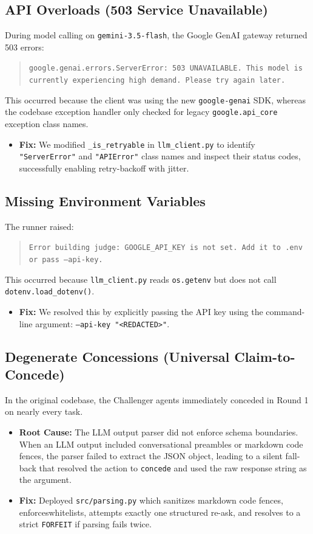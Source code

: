 \documentclass[11pt]{article}
\begin{document}
\subsection{API Overloads (503 Service Unavailable)}
During model calling on \texttt{gemini-3.5-flash}, the Google GenAI gateway returned 503 errors:
\begin{quote}
\texttt{google.genai.errors.ServerError: 503 UNAVAILABLE. This model is currently experiencing high demand. Please try again later.}
\end{quote}
This occurred because the client was using the new \texttt{google-genai} SDK, whereas the codebase exception handler only checked for legacy \texttt{google.api\_core} exception class names.
\begin{itemize}
    \item \textbf{Fix:} We modified \texttt{\_is\_retryable} in \texttt{llm\_client.py} to identify \texttt{"ServerError"} and \texttt{"APIError"} class names and inspect their status codes, successfully enabling retry-backoff with jitter.
\end{itemize}

\subsection{Missing Environment Variables}
The runner raised:
\begin{quote}
\texttt{Error building judge: GOOGLE\_API\_KEY is not set. Add it to .env or pass --api-key.}
\end{quote}
This occurred because \texttt{llm\_client.py} reads \texttt{os.getenv} but does not call \texttt{dotenv.load\_dotenv()}.
\begin{itemize}
    \item \textbf{Fix:} We resolved this by explicitly passing the API key using the command-line argument: \texttt{--api-key "<REDACTED>"}.
\end{itemize}

\subsection{Degenerate Concessions (Universal Claim-to-Concede)}
In the original codebase, the Challenger agents immediately conceded in Round 1 on nearly every task.
\begin{itemize}
    \item \textbf{Root Cause:} The LLM output parser did not enforce schema boundaries. When an LLM output included conversational preambles or markdown code fences, the parser failed to extract the JSON object, leading to a silent fall-back that resolved the action to \texttt{concede} and used the raw response string as the argument.
    \item \textbf{Fix:} Deployed \texttt{src/parsing.py} which sanitizes markdown code fences, enforceswhitelists, attempts exactly one structured re-ask, and resolves to a strict \texttt{FORFEIT} if parsing fails twice.
\end{itemize}
\end{document}
